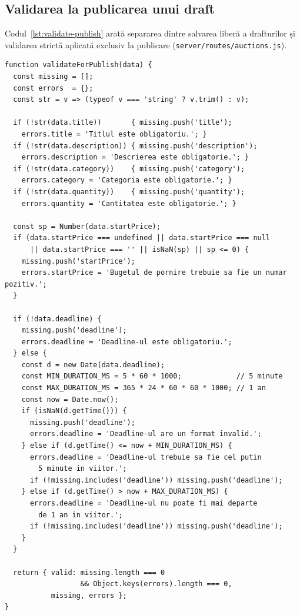 \begin{appendices}
\section{Validarea la publicarea unui draft}

Codul~\ref{lst:validate-publish} arată separarea dintre salvarea liberă a drafturilor și validarea strictă aplicată exclusiv la publicare (\texttt{server/routes/auctions.js}).

\begin{lstlisting}[caption={Validarea câmpurilor obligatorii la publicare},label={lst:validate-publish}]
function validateForPublish(data) {
  const missing = [];
  const errors  = {};
  const str = v => (typeof v === 'string' ? v.trim() : v);

  if (!str(data.title))       { missing.push('title');
    errors.title = 'Titlul este obligatoriu.'; }
  if (!str(data.description)) { missing.push('description');
    errors.description = 'Descrierea este obligatorie.'; }
  if (!str(data.category))    { missing.push('category');
    errors.category = 'Categoria este obligatorie.'; }
  if (!str(data.quantity))    { missing.push('quantity');
    errors.quantity = 'Cantitatea este obligatorie.'; }

  const sp = Number(data.startPrice);
  if (data.startPrice === undefined || data.startPrice === null
      || data.startPrice === '' || isNaN(sp) || sp <= 0) {
    missing.push('startPrice');
    errors.startPrice = 'Bugetul de pornire trebuie sa fie un numar pozitiv.';
  }

  if (!data.deadline) {
    missing.push('deadline');
    errors.deadline = 'Deadline-ul este obligatoriu.';
  } else {
    const d = new Date(data.deadline);
    const MIN_DURATION_MS = 5 * 60 * 1000;             // 5 minute
    const MAX_DURATION_MS = 365 * 24 * 60 * 60 * 1000; // 1 an
    const now = Date.now();
    if (isNaN(d.getTime())) {
      missing.push('deadline');
      errors.deadline = 'Deadline-ul are un format invalid.';
    } else if (d.getTime() <= now + MIN_DURATION_MS) {
      errors.deadline = 'Deadline-ul trebuie sa fie cel putin
        5 minute in viitor.';
      if (!missing.includes('deadline')) missing.push('deadline');
    } else if (d.getTime() > now + MAX_DURATION_MS) {
      errors.deadline = 'Deadline-ul nu poate fi mai departe
        de 1 an in viitor.';
      if (!missing.includes('deadline')) missing.push('deadline');
    }
  }

  return { valid: missing.length === 0
                  && Object.keys(errors).length === 0,
           missing, errors };
}
\end{lstlisting}


\end{appendices}
